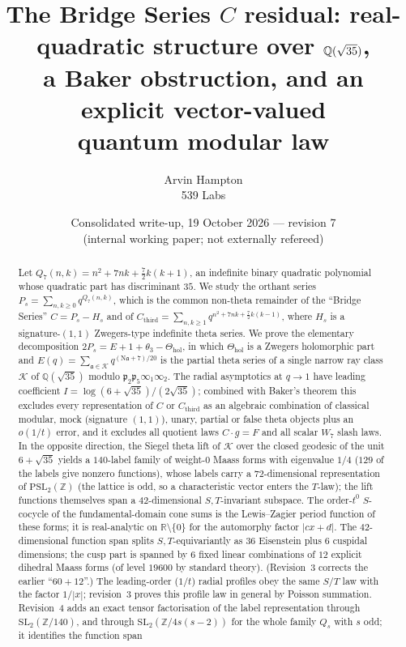 \documentclass[11pt]{article}
\title{The Bridge Series $C$ residual: real-quadratic structure over $\Q(\sqrt{35})$,\\
a Baker obstruction, and an explicit vector-valued\\ quantum modular law}
\author{Arvin Hampton\\ \small 539 Labs}
\date{Consolidated write-up, 19 October 2026 --- revision 7\\ \small (internal working paper; not externally refereed)}
\theoremstyle{definition}
\theoremstyle{plain}
\newcommand{\Q}{\mathbb{Q}}
\newcommand{\Z}{\mathbb{Z}}
\newcommand{\R}{\mathbb{R}}
\newcommand{\K}{\mathcal{K}}
\newcommand{\fp}{\mathfrak{p}}
\newcommand{\fa}{\mathfrak{a}}
\newcommand{\Thol}{\Theta_{\mathrm{hol}}}
\newcommand{\Cthird}{C_{\mathrm{third}}}
\newcommand{\Nm}{\mathrm{N}}
\begin{document}
\maketitle

\begin{abstract}
Let $Q_7(n,k)=n^2+7nk+\tfrac72 k(k+1)$, an indefinite binary quadratic polynomial whose
quadratic part has discriminant $35$. We study the orthant series
$P_s=\sum_{n,k\ge 0}q^{Q_7(n,k)}$, which is the common non-theta remainder of the
``Bridge Series'' $C=P_s-H_s$ and of $\Cthird=\sum_{n,k\ge1}q^{n^2+7nk+\frac72k(k-1)}$,
where $H_s$ is a signature-$(1,1)$ Zwegers-type indefinite theta series.
We prove the elementary decomposition $2P_s=E+1+\theta_3-\Thol$, in which
$\Thol$ is a Zwegers holomorphic part and $E(q)=\sum_{\fa\in\K}q^{(\Nm\fa+7)/20}$ is the
partial theta series of a single narrow ray class $\K$ of $\Q(\sqrt{35})$ modulo $\fp_2\fp_5\infty_1\infty_2$.
The radial asymptotics at $q\to1$ have leading coefficient
$I=\log(6+\sqrt{35})/(2\sqrt{35})$; combined with Baker's theorem this excludes every
representation of $C$ or $\Cthird$ as an algebraic combination of classical modular, mock
(signature $(1,1)$), unary, partial or false theta objects plus an $o(1/t)$ error, and it excludes
all quotient laws $C\cdot g=F$ and all scalar $W_7$ slash laws. In the opposite direction,
the Siegel theta lift of $\K$ over the closed geodesic of the unit $6+\sqrt{35}$ yields a
$140$-label family of weight-$0$ Maass forms with eigenvalue $1/4$ ($129$ of the labels give nonzero functions), whose labels carry a $72$-dimensional
representation of $\mathrm{PSL}_2(\Z)$ (the lattice is odd, so a characteristic vector enters the $T$-law); the lift functions themselves span a
$42$-dimensional $S,T$-invariant subspace.
The order-$t^0$ $S$-cocycle of the fundamental-domain cone sums is the Lewis--Zagier period
function of these forms; it is real-analytic on $\R\setminus\{0\}$ for the automorphy factor
$|cx+d|$. The $42$-dimensional function span splits $S,T$-equivariantly as $36$ Eisenstein plus $6$ cuspidal dimensions; the cusp part is
spanned by $6$ fixed linear combinations of $12$ explicit dihedral Maass forms (of level $19600$ by standard theory). (Revision~3 corrects the
earlier ``$60+12$''.) The leading-order ($1/t$) radial profiles obey the same $S/T$ law with the factor $1/|x|$; revision~3 proves this
profile law in general by Poisson summation. Revision~4 adds an exact tensor factorisation of the label representation through
$\mathrm{SL}_2(\Z/140)$, and through $\mathrm{SL}_2(\Z/4s(s-2))$ for the whole family $Q_s$ with $s$ odd; it identifies the function span

\end{abstract}
\end{document}
